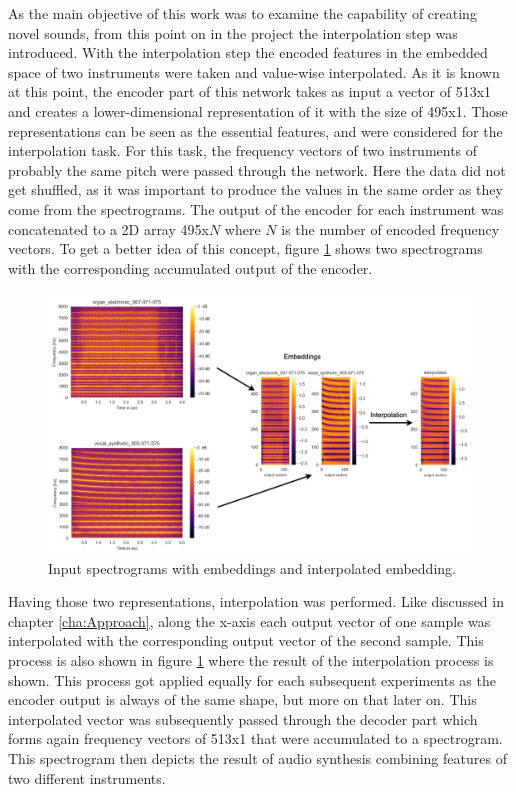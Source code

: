 As the main objective of this work was to examine the capability of creating novel sounds, from this point on in the project the interpolation step was introduced. With the interpolation step the encoded features in the embedded space of two instruments were taken and value-wise interpolated. As it is known at this point, the encoder part of this network takes as input a vector of 513x1 and creates a lower-dimensional representation of it with the size of 495x1. Those representations can be seen as the essential features, and were considered for the interpolation task. For this task, the frequency vectors of two instruments of probably the same pitch were passed through the network. Here the data did not get shuffled, as it was important to produce the values in the same order as they come from the spectrograms. The output of the encoder for each instrument was concatenated to a 2D array 495x$N$ where $N$ is the number of encoded frequency vectors. To get a better idea of this concept, figure \ref{fig:exp_spec_emb_int_1D} shows two spectrograms with the corresponding accumulated output of the encoder.\\ 

 \begin{figure}[htb!]
	\caption{Input spectrograms with embeddings and interpolated embedding.}
	\label{fig:exp_spec_emb_int_1D}
	\centering
	\includegraphics[width=\textwidth]{images/experiments/spec_to_emb.png}
\end{figure}

Having those two representations, interpolation was performed. Like discussed in chapter \ref{cha:Approach}, along the x-axis each output vector of one sample was interpolated with the corresponding output vector of the second sample. This process is also shown in figure \ref{fig:exp_spec_emb_int_1D} where the result of the interpolation process is shown. This process got applied equally for each subsequent experiments as the encoder output is always of the same shape, but more on that later on.
This interpolated vector was subsequently passed through the decoder part which forms again frequency vectors of 513x1 that were accumulated to a spectrogram. This spectrogram then depicts the result of audio synthesis combining features of two different instruments.


